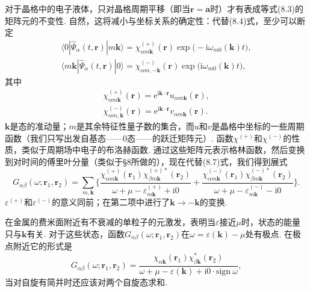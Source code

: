 对于晶格中的电子液体，只对晶格周期平移（即当$\bm{r}=\bm{a}$时）才有表成等式(8.3)的矩阵元的不变性. 自然，这将减小与坐标关系的确定性：代替(8.4)式，至少可以断定
\begin{equation}
\begin{gathered}
\langle0|\hat{\varPsi}_\alpha(t,\bm{r})|m\bm{k}\rangle
=\chi^{(+)}_{\alpha m\bm{k}}(\bm{r})\exp\bigl(-\mathrm{i}\omega_{m0}(\bm{k})t\bigr),\\
\langle m\bm{k}|\hat{\varPsi}_\alpha(t,\bm{r})|0\rangle
=\chi^{(-)}_{\alpha m,-\bm{k}}(\bm{r})\exp\bigl(\mathrm{i}\omega_{m0}(\bm{k})t\bigr),
\end{gathered}
\end{equation}
其中
\begin{equation}
\begin{gathered}
\chi^{(+)}_{\alpha m\bm{k}}(\bm{r})=\mathrm{e}^{\mathrm{i}\bm{k}\cdot\bm{r}}u_{\alpha m\bm{k}}(\bm{r}),\\
\chi^{(-)}_{\alpha m,\bm{k}}(\bm{r})=\mathrm{e}^{\mathrm{i}\bm{k}\cdot\bm{r}}v_{\alpha m\bm{k}}(\bm{r}).
\end{gathered}
\end{equation}
$\bm{k}$是态的准动量；$m$是其余特征性量子数的集合，而$u$和$v$是晶格中坐标的一些周期函数（我们只写出发自基态——0态——的跃迁矩阵元）. 函数$\chi^{(+)}$和$\chi^{(-)}$的性质，类似于周期场中电子的布洛赫函数. 通过这些矩阵元表示格林函数，然后变换到对时间的傅里叶分量（类似于§8所做的），现在代替(8.7)式，我们得到展式
\begin{equation}
G_{\alpha\beta}(\omega;\bm{r}_1,\bm{r}_2)=\sum_{m,\bm{k}}
\biggl\{\frac{\chi^{(+)}_{\alpha m\bm{k}}(\bm{r}_1)\chi^{(+)*}_{\beta m\bm{k}}(\bm{r}_2)}
{\omega+\mu-\varepsilon^{(+)}_{m\bm{k}}+\mathrm{i}0}
+\frac{\chi^{(-)}_{\alpha m\bm{k}}(\bm{r}_1)\chi^{(-)*}_{\beta m\bm{k}}(\bm{r}_2)}
{\omega+\mu-\varepsilon^{(-)}_{m\bm{k}}-\mathrm{i}0}\biggr\}.
\end{equation}
$\varepsilon^{(+)}$和$\varepsilon^{(-)}$的意义同前；在第二项中进行了$\bm{k}\to-\bm{k}$的变换.

在金属的费米面附近有不衰减的单粒子的元激发，表明当$\varepsilon$接近$\mu$时，状态的能量只与$\bm{k}$有关. 对于这些状态，函数$G_{\alpha\beta}(\omega;\bm{r}_1,\bm{r}_2)$在$\omega=\varepsilon(\bm{k})-\mu$处有极点. 在极点附近它的形式是
\begin{equation}
G_{\alpha\beta}(\omega;\bm{r}_1,\bm{r}_2)=
\frac{\chi_{\alpha\bm{k}}(\bm{r}_1)\chi^{*}_{\beta\bm{k}}(\bm{r}_2)}
{\omega+\mu-\varepsilon(\bm{k})+\mathrm{i}0\cdot\mathrm{sign}\ \omega},
\end{equation}
当对自旋有简并时还应该对两个自旋态求和.

